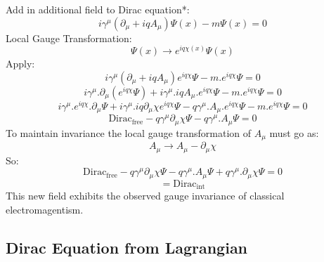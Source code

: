 Add in additional field to Dirac equation*:
\begin{equation*}
i\gamma^{\mu}(\partial_{\mu}+iqA_{\mu})\Psi(x)-m\Psi(x)=0
\end{equation*}
Local Gauge Transformation:
\begin{equation*}
\Psi(x) \to e^{iq\chi(x)}\Psi(x)
\end{equation*}
Apply:
\begin{equation*}
i\gamma^{\mu}(\partial_{\mu}+iqA_{\mu})e^{iq\chi}\Psi-m.e^{iq\chi}\Psi=0
\end{equation*}
\begin{equation*}
i\gamma^{\mu}.\partial_{\mu}(e^{iq\chi}\Psi)+i\gamma^{\mu}.iqA_{\mu}.e^{iq\chi}\Psi-m.e^{iq\chi}\Psi=0
\end{equation*}
\begin{equation*}
i\gamma^{\mu}.e^{iq\chi}.\partial_{\mu}\Psi+i\gamma^{\mu}.iq\partial_{\mu}\chi e^{iq\chi}\Psi-q\gamma^{\mu}.A_{\mu}.e^{iq\chi}\Psi-m.e^{iq\chi}\Psi=0
\end{equation*}
\begin{equation*}
\text{Dirac}_\text{free}-q\gamma^{\mu}\partial_{\mu}\chi\Psi-q\gamma^{\mu}.A_{\mu}\Psi=0
\end{equation*}
To maintain invariance the local gauge transformation of $A_{\mu}$ must go as:
\begin{equation*}
A_{\mu} \to A_{\mu} - \partial_{\mu}\chi
\end{equation*}
So:
\begin{equation*}
\text{Dirac}_\text{free}-q\gamma^{\mu}\partial_{\mu}\chi\Psi-q\gamma^{\mu}.A_{\mu}\Psi+q\gamma^{\mu}.\partial_{\mu}\chi\Psi=0
\end{equation*}
\begin{equation*}
=\text{Dirac}_\text{int}
\end{equation*}
This new field exhibits the observed gauge invariance of classical electromagentism.

\subsection{Dirac Equation from Lagrangian} %
\label{sub:dirac_equation*_from_lagrangian}


